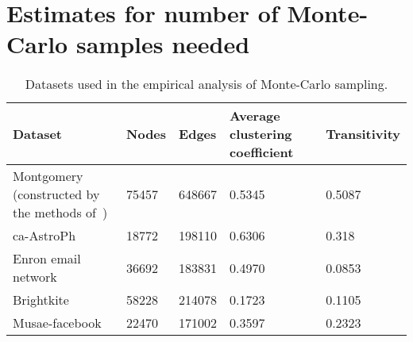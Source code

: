 
\section{Estimates for number of Monte-Carlo samples needed}
\label{sec:experiments}

\begin{table}[!ht]
\centering
\begin{small}
\begin{tabular}{|p{3in}|l|l|p{1.0in}|p{1.0in}|}
\hline
 \textbf{Dataset} & \textbf{Nodes} & \textbf{Edges} & \textbf{Average clustering coefficient}
& \textbf{Transitivity}  \\ 
\hline
 Montgomery (constructed by the methods of~\cite{barrett:wsc09,eubank:nature04}) & 75457 & 648667 & 0.5345 &  0.5087\\
 ca-AstroPh~\cite{snap} & 18772 & 198110 & 0.6306 & 0.318\\
 Enron email network~\cite{snap} & 36692 & 183831 & 0.4970 & 0.0853\\   
 Brightkite~\cite{snap} & 58228 & 214078 & 0.1723 & 0.1105\\ 
Musae-facebook~\cite{snap} & 22470 & 171002 & 0.3597 & 0.2323\\ 
\hline
\end{tabular}
\end{small}
\caption{Datasets used in the empirical analysis of Monte-Carlo sampling.}
\label{tab:datasets}
\end{table}


